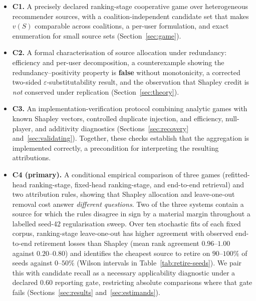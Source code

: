 \documentclass[pdflatex,sn-basic,Numbered]{sn-jnl}
\theoremstyle{plain}
\theoremstyle{definition}
\begin{document}
\begin{itemize}
\item \textbf{C1.} A precisely declared ranking-stage cooperative game over
      heterogeneous recommender sources, with a coalition-independent candidate
      set that makes $v(S)$ comparable across coalitions, a per-user
      formulation, and exact enumeration for small source sets
      (Section~\ref{sec:game}).
\item \textbf{C2.} A formal characterisation of source allocation under
      redundancy: efficiency and per-user decomposition, a counterexample
      showing the redundancy--positivity property is \textbf{false} without
      monotonicity, a corrected two-sided $\varepsilon$-substitutability
      result, and the observation that Shapley credit is \emph{not} conserved
      under replication (Section~\ref{sec:theory}).
\item \textbf{C3.} An implementation-verification protocol combining
      analytic games with known Shapley vectors, controlled duplicate
      injection, and efficiency, null-player, and additivity diagnostics
      (Sections~\ref{sec:recovery} and~\ref{sec:validating}). Together, these
      checks establish that the aggregation is implemented correctly, a
      precondition for interpreting the resulting attributions.
\item \textbf{C4 (primary).} A conditional empirical comparison of three games
      (refitted-head ranking-stage, fixed-head ranking-stage, and end-to-end
      retrieval) and two attribution rules, showing that Shapley allocation and
      leave-one-out removal cost answer \emph{different questions}. Two of the
      three systems contain a source for which the rules disagree in sign by a
      material margin throughout a labelled seed-42 regularisation sweep. Over
      ten stochastic fits of each fixed corpus, ranking-stage leave-one-out has
      higher agreement with observed end-to-end retirement losses than Shapley
      (mean rank agreement
      $0.96$--$1.00$ against $0.20$--$0.80$) and identifies the
      cheapest source to retire on $90$--$100\%$ of seeds against
      $0$--$50\%$ (Wilson intervals in Table~\ref{tab:retire-seeds}). We pair this with
      candidate recall as a necessary applicability diagnostic under a
      declared $0.60$ reporting gate, restricting absolute comparisons where
      that gate fails (Sections~\ref{sec:results} and~\ref{sec:estimands}).
\end{itemize}
\end{document}
